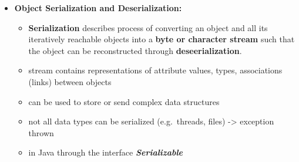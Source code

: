 \documentclass[ieeetran]{article}
\begin{document}
\begin{itemize}
\item \textbf{Object Serialization and Deserialization:}
	\begin{itemize}
	  \item \textbf{Serialization} describes process of converting an object and all its iteratively reachable objects into a \textbf{byte or character stream} such that the object can be reconstructed through \textbf{deseerialization}.
	\item stream contains representations of attribute values, types, associations (links) between objects
	  \item can be used to store or send complex data structures
	\item not all data types can be serialized (e.g.\ threads, files) -> exception thrown
\item in Java through the interface \textit{\textbf{Serializable}}
	
	\end{itemize}
\end{itemize}
\end{document}

